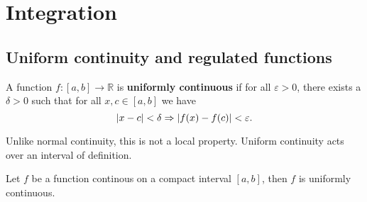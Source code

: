 \chapter{Integration}

\section{Uniform continuity and regulated functions}

\begin{definition}
    A function $f : [a, b] \to \mathbb R$ is \textbf{uniformly continuous} if for all $\varepsilon > 0$, there exists a $\delta > 0$ such that for all $x, c \in [a, b]$ we have \[ \lvert x - c\rvert < \delta \Rightarrow \lvert f(x) - f(c)\rvert < \varepsilon. \]
\end{definition}

\begin{remark}
    Unlike normal continuity, this is not a local property. Uniform continuity acts over an interval of definition.
\end{remark}

\begin{theorem}
    Let $f$ be a function continous on a compact interval $[a, b]$, then $f$ is uniformly continuous.
\end{theorem}

